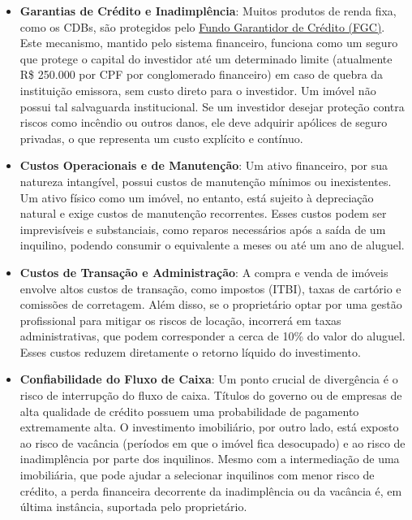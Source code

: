 \documentclass[
  a4paper,
]{book}
\begin{document}
\begin{itemize}
\item
  \textbf{Garantias de Crédito e Inadimplência}: Muitos produtos de
  renda fixa, como os CDBs, são protegidos pelo
  \href{https://www.bb.com.br/site/investimentos/fgc/}{Fundo Garantidor
  de Crédito (FGC)}. Este mecanismo, mantido pelo sistema financeiro,
  funciona como um seguro que protege o capital do investidor até um
  determinado limite (atualmente R\$ 250.000 por CPF por conglomerado
  financeiro) em caso de quebra da instituição emissora, sem custo
  direto para o investidor. Um imóvel não possui tal salvaguarda
  institucional. Se um investidor desejar proteção contra riscos como
  incêndio ou outros danos, ele deve adquirir apólices de seguro
  privadas, o que representa um custo explícito e contínuo.
\item
  \textbf{Custos Operacionais e de Manutenção}: Um ativo financeiro, por
  sua natureza intangível, possui custos de manutenção mínimos ou
  inexistentes. Um ativo físico como um imóvel, no entanto, está sujeito
  à depreciação natural e exige custos de manutenção recorrentes. Esses
  custos podem ser imprevisíveis e substanciais, como reparos
  necessários após a saída de um inquilino, podendo consumir o
  equivalente a meses ou até um ano de aluguel.
\item
  \textbf{Custos de Transação e Administração}: A compra e venda de
  imóveis envolve altos custos de transação, como impostos (ITBI), taxas
  de cartório e comissões de corretagem. Além disso, se o proprietário
  optar por uma gestão profissional para mitigar os riscos de locação,
  incorrerá em taxas administrativas, que podem corresponder a cerca de
  10\% do valor do aluguel. Esses custos reduzem diretamente o retorno
  líquido do investimento.
\item
  \textbf{Confiabilidade do Fluxo de Caixa}: Um ponto crucial de
  divergência é o risco de interrupção do fluxo de caixa. Títulos do
  governo ou de empresas de alta qualidade de crédito possuem uma
  probabilidade de pagamento extremamente alta. O investimento
  imobiliário, por outro lado, está exposto ao risco de vacância
  (períodos em que o imóvel fica desocupado) e ao risco de inadimplência
  por parte dos inquilinos. Mesmo com a intermediação de uma
  imobiliária, que pode ajudar a selecionar inquilinos com menor risco
  de crédito, a perda financeira decorrente da inadimplência ou da
  vacância é, em última instância, suportada pelo proprietário.
\end{itemize}
\end{document}
